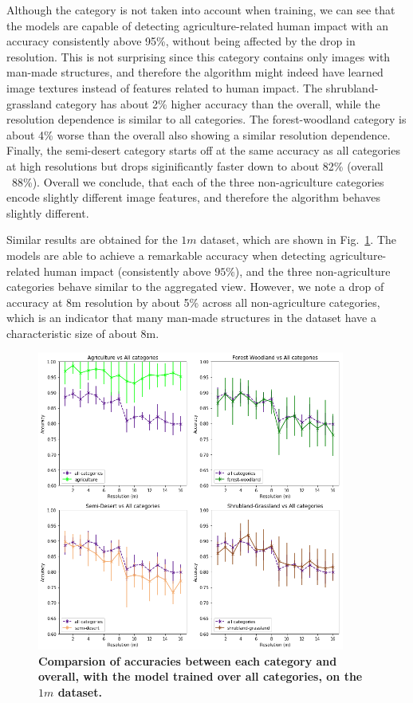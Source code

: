 Although the category is not taken into account when training, we can see that the models are capable of detecting agriculture-related human impact with an accuracy consistently above 95\%, without being affected by the drop in resolution. This is not surprising since this category contains only images with man-made structures, and therefore the algorithm might indeed have learned image textures instead of features related to human impact.
The shrubland-grassland category has about 2\% higher accuracy than the overall, while the resolution dependence is similar to all categories. The forest-woodland category is  about 4\% worse than the overall also showing a similar resolution dependence. Finally, the semi-desert category starts off at the same accuracy as all categories at high resolutions but drops siginificantly faster down to about 82\% (overall ~88\%). Overall we conclude, that each of the three non-agriculture categories encode slightly different image features, and therefore the algorithm behaves slightly different.

Similar results are obtained for the $1m$ dataset, which are shown in Fig.~\ref{fig:acc_by_cat_1m}. The models are able to achieve a remarkable accuracy when detecting agriculture-related human impact (consistently above $95\%$), and the three non-agriculture categories behave similar to the aggregated view. However, we note a drop of accuracy at 8m resolution by about 5\% across all non-agriculture categories, which is an indicator that many man-made structures in the dataset have a characteristic size of  about 8m.

\begin{figure}[H]
	\centering
	\includegraphics[width=0.9\textwidth]{Figures/results/acc_res_by_category_1m.png}
	\captionsetup{width=1\linewidth}
	\caption{\textbf{Comparsion of accuracies between each category and overall, with the model trained over all categories, on the $1m$ dataset.}}
	\label{fig:acc_by_cat_1m}
\end{figure}


